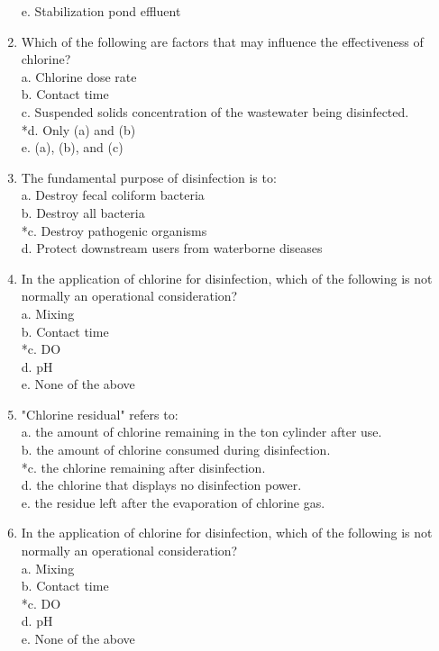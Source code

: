 \begin{enumerate}
e. Stabilization pond effluent \\
\item Which of the following are factors that may influence the effectiveness of chlorine? \\
a. Chlorine dose rate \\
b. Contact time \\
c. Suspended solids concentration of the wastewater being disinfected. \\
*d. Only (a) and (b) \\
e. (a), (b), and (c) \\
\item The fundamental purpose of disinfection is to: \\
a. Destroy fecal coliform bacteria \\
b. Destroy all bacteria \\
*c. Destroy pathogenic organisms \\
d. Protect downstream users from waterborne diseases \\
\item In the application of chlorine for disinfection, which of the following is not normally an operational consideration? \\
a. Mixing \\
b. Contact time \\
*c. DO \\
d. pH \\
e. None of the above \\
\item "Chlorine residual" refers to: \\
a. the amount of chlorine remaining in the ton cylinder after use. \\
b. the amount of chlorine consumed during disinfection. \\
*c. the chlorine remaining after disinfection. \\
d. the chlorine that displays no disinfection power. \\
e. the residue left after the evaporation of chlorine gas. \\
\item In the application of chlorine for disinfection, which of the following is not normally an operational consideration? \\
a. Mixing \\
b. Contact time \\
*c. DO \\
d. pH \\
e. None of the above \\

\end{enumerate}
